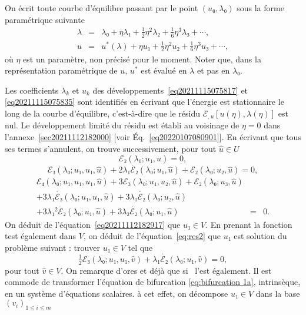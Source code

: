 \documentclass[12pt, final]{amsart}
\theoremstyle{definition}
\begin{document}
On écrit toute courbe d'équilibre passant par le point \((u₀, λ₀)\) sous la forme paramétrique suivante
\begin{eqnarray}
  λ & = & λ₀ + η λ₁ + \tfrac{1}{2} η^2 λ₂ +
  \tfrac{1}{6} η^3 λ₃ + \cdots,  \label{eq20211115075817}\\
  u & = & u^{\ast}(λ) + η u₁ + \tfrac{1}{2} η^2 u₂ +
  \tfrac{1}{6} η^3 u₃ + \cdots,  \label{eq20211115075835}
\end{eqnarray}
où \(η\) est un paramètre, non précisé pour le moment. Noter que, dans la représentation paramétrique de \(u\), \(u^{\ast}\) est évalué en \(λ\) et pas en \(λ₀\).

Les coefficients \(λ_k\) et \(u_k\) des développements~\eqref{eq20211115075817} et \eqref{eq20211115075835} sont identifiés en écrivant que l'énergie est stationnaire le long de la courbe d'équilibre, c'est-à-dire que le résidu \(ℰ_{, u}  [u(η), λ(η)]\) est nul. Le développement limité du résidu est établi au voisinage de \(η = 0\) dans l'annexe~\ref{sec20211112182000} [voir Éq.~\eqref{eq20220107080901}]. En écrivant que tous ses termes s'annulent, on trouve successivement, pour tout \(\hat{u}∈U\)
\begin{equation}
  \label{eq20211112182917} ℰ₂(λ₀ ; u₁, \hat{u}) = 0,
\end{equation}
\begin{equation}
  \label{eq:res2} ℰ₃(λ₀ ; u₁, u₁, \hat{u}) + 2 λ₁
  \dot{ℰ₂}(λ₀ ; u₁, \hat{u}) +ℰ₂(λ₀ ;
  u₂, \hat{u}) = 0,
\end{equation}
\begin{eqnarray}
  ℰ₄(λ₀ ; u₁, u₁, u₁, \hat{u}) + 3ℰ₃
 (λ₀ ; u₁, u₂, \hat{u}) +ℰ₂(λ₀ ; u₃, \hat{u}) &
  &  \nonumber\\
  + 3 λ₁  \dot{ℰ₃}(λ₀ ; u₁, u₁, \hat{u}) + 3
  λ₁  \dot{ℰ₂}(λ₀ ; u₂, \hat{u}) &  &  \nonumber\\
  + 3 λ₁^2  \ddot{ℰ₂}(λ₀ ; u₁, \hat{u}) + 3
  λ₂  \dot{ℰ₂}(λ₀ ; u₁, \hat{u}) & = & 0.
  \label{eq:res3}
\end{eqnarray}
On déduit de l'équation~\eqref{eq20211112182917} que \(u₁∈V\). En prenant la fonction test également dans \(V\), on déduit de l'équation~\eqref{eq:res2} que \(u₁\) est solution du problème suivant : trouver \(u₁∈V\) tel que
\begin{equation}
  \label{eq:bifurcation 1a} \tfrac{1}{2} ℰ₃(λ₀ ; u₁, u₁,
  \hat{v}) + λ₁  \dot{ℰ₂}(λ₀ ; u₁, \hat{v}) = 0,
\end{equation}
pour tout \(\hat{v}∈V\). On remarque d'ores et déjà que si \ l'est également. Il est commode de transformer l'équation de bifurcation \eqref{eq:bifurcation 1a}, intrinsèque, en un système d'équations scalaires. à cet effet, on décompose \(u₁∈V\) dans la base \((v_i)_{1 \leqslant i \leqslant m}\)
\end{document}
